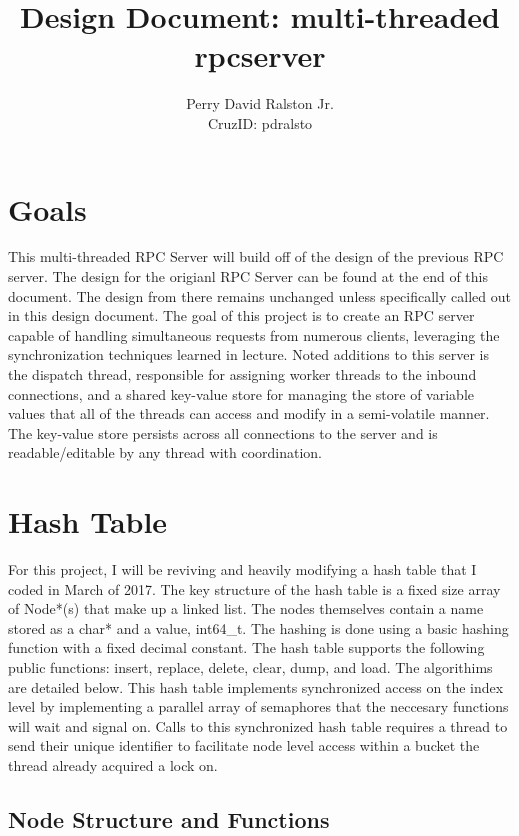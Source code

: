 \documentclass[11pt,letterpaper]{article}
\title{Design Document: multi-threaded rpcserver}
\author{Perry David Ralston Jr.\\ CruzID: pdralsto}
\begin{document}
\maketitle
\thispagestyle{fancy}
\section{Goals}

This multi-threaded RPC Server will build off of the design of the previous RPC server. The design for the origianl RPC Server can be found at the end of this document. The design from there remains unchanged unless specifically called out in this design document. The goal of this project is to create an RPC server capable of handling simultaneous requests from numerous clients, leveraging the synchronization techniques learned in lecture. Noted additions to this server is the dispatch thread, responsible for assigning worker threads to the inbound connections, and a shared key-value store for managing the store of variable values that all of the threads can access and modify in a semi-volatile manner. The key-value store persists across all connections to the server and is readable/editable by any thread with coordination.

\section{Hash Table}

For this project, I will be reviving and heavily modifying a hash table that I coded in March of 2017. The key structure of the hash table is a fixed size array of Node*(s) that make up a linked list. The nodes themselves contain a name stored as a char* and a value, int64\_t. The hashing is done using a basic hashing function with a fixed decimal constant. The hash table supports the following public functions: insert, replace, delete, clear, dump, and load. The algorithims are detailed below. This hash table implements synchronized access on the index level by implementing a parallel array of semaphores that the neccesary functions will wait and signal on. Calls to this synchronized hash table requires a thread to send their unique identifier to facilitate node level access within a bucket the thread already acquired a lock on.

\subsection{Node Structure and Functions}
\end{document}
